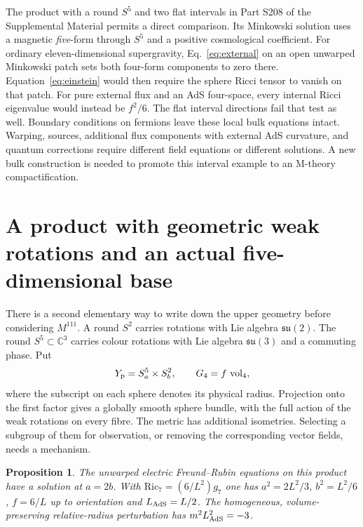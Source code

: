 \documentclass[aps,prd,reprint,onecolumn,nofootinbib,amsmath,amssymb]{revtex4-2}
\newtheorem{proposition}{Proposition}
\begin{document}
The product with a round $S^5$ and two flat intervals in Part S208 of the Supplemental Material permits a direct comparison. Its Minkowski solution uses a magnetic \emph{five}-form through $S^5$ and a positive cosmological coefficient. For ordinary eleven-dimensional supergravity, Eq.~\eqref{eq:external} on an open unwarped Minkowski patch sets both four-form components to zero there. Equation~\eqref{eq:einstein} would then require the sphere Ricci tensor to vanish on that patch. For pure external flux and an AdS four-space, every internal Ricci eigenvalue would instead be $f^2/6$. The flat interval directions fail that test as well. Boundary conditions on fermions leave these local bulk equations intact. Warping, sources, additional flux components with external AdS curvature, and quantum corrections require different field equations or different solutions. A new bulk construction is needed to promote this interval example to an M-theory compactification.

\section{A product with geometric weak rotations and an actual five-dimensional base}
There is a second elementary way to write down the upper geometry before considering $M^{111}$. A round $S^2$ carries rotations with Lie algebra $\mathfrak{su}(2)$. The round $S^5\subset\mathbb C^3$ carries colour rotations with Lie algebra $\mathfrak{su}(3)$ and a commuting phase. Put
\begin{equation}
 Y_{\rm p}=S^5_a\times S^2_b,\qquad
 G_4=f\,\operatorname{vol}_4 ,
\end{equation}
where the subscript on each sphere denotes its physical radius. Projection onto the first factor gives a globally smooth sphere bundle, with the full action of the weak rotations on every fibre. The metric has additional isometries. Selecting a subgroup of them for observation, or removing the corresponding vector fields, needs a mechanism.

\begin{proposition}
The unwarped electric Freund--Rubin equations on this product have a solution at $a=2b$. With $\mathrm{Ric}_7=(6/L^2)g_7$ one has $a^2=2L^2/3$, $b^2=L^2/6$, $f=6/L$ up to orientation and $L_{\rm AdS}=L/2$. The homogeneous, volume-preserving relative-radius perturbation has $m^2L_{\rm AdS}^2=-3$.
\end{proposition}
\end{document}
